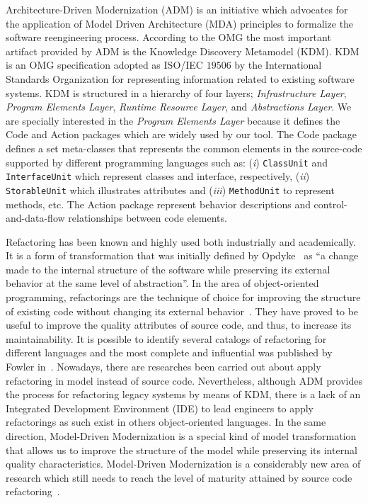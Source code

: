 Architecture-Driven Modernization (ADM) is an initiative which advocates for the application of Model Driven Architecture (MDA) principles to formalize the software reengineering process. 
%
%
According to the OMG the most important artifact provided by ADM is the Knowledge Discovery Metamodel (KDM). KDM is an OMG specification adopted as ISO/IEC $19506$ by the International Standards Organization for representing information related to existing software systems.  KDM is structured in a hierarchy of four layers; \textit{Infrastructure Layer}, \textit{Program Elements Layer}, \textit{ Runtime Resource Layer}, and \textit{Abstractions Layer}. We are specially interested in the \textit{Program Elements Layer} because it defines the Code and Action packages which are widely used by our tool. The Code package defines a set meta-classes that represents the common elements in the source-code supported by different programming languages such as: (\textit{i}) \texttt{ClassUnit} and \texttt{InterfaceUnit} which represent classes and interface, respectively, (\textit{ii}) \texttt{StorableUnit} which illustrates attributes and (\textit{iii}) \texttt{MethodUnit} to represent methods, etc. The Action package represent behavior descriptions and control-and-data-flow relationships between code elements.
 

Refactoring has been known and highly used both industrially and academically. It is a form of transformation that was initially defined by Opdyke~\cite{Opdy92b} as ``a change made to the internal structure of the software while preserving its external behavior at the same level of abstraction''. In the area of object-oriented programming, refactorings are the technique of choice for improving the structure of existing code without changing its external behavior~\cite{refactImpro}. They have proved to be useful to improve the quality attributes of source code, and thus, to increase its maintainability. It is possible to identify several catalogs of refactoring for different languages and the most complete and influential was published by Fowler in~\cite{refactImpro}. 
Nowadays, there are researches been carried out about apply refactoring in model instead of source code\cite{Ulrich:2010:IST:1841736}. %
Nevertheless, although ADM provides the process for refactoring legacy systems by means of KDM, there is a lack of an Integrated Development Environment (IDE) to lead engineers to apply refactorings as such exist in others object-oriented languages. In the same direction, Model-Driven Modernization is a special kind of model transformation that allows us to improve the structure of the model while preserving its internal quality characteristics. Model-Driven Modernization is a considerably new area of research which still needs to reach the level of maturity attained by source code refactoring~\cite{ModelDrivenRefactoring}. 

